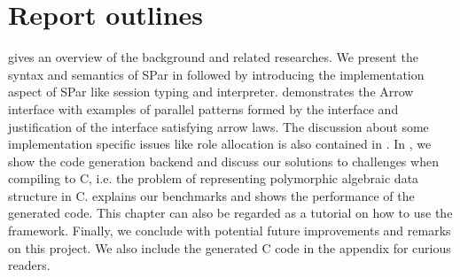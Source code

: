 \section{Report outlines}

 gives an overview of the background and related researches. We present the syntax and semantics of SPar in  followed by  introducing the implementation aspect of SPar like session typing and interpreter.  demonstrates the Arrow interface with examples of parallel patterns formed by the interface and justification of the interface satisfying arrow laws. The discussion about some implementation specific issues like role allocation is also contained in . In , we show the code generation backend and discuss our solutions to challenges when compiling to C, i.e. the problem of representing polymorphic algebraic data structure in C.  explains our benchmarks and shows the performance of the generated code. This chapter can also be regarded as a tutorial on how to use the framework. Finally, we conclude with potential future improvements and remarks on this project. We also include the generated C code in the appendix for curious readers.